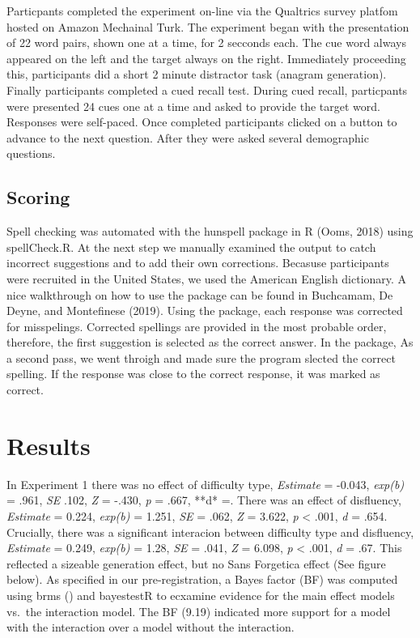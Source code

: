\documentclass[pdf]{apa6}
\begin{document}
Particpants completed the experiment on-line via the Qualtrics survey platfom hosted on Amazon Mechainal Turk. The experiment began with the presentation of 22 word pairs, shown one at a time, for 2 secconds each. The cue word always appeared on the left and the target always on the right. Immediately proceeding this, participants did a short 2 minute distractor task (anagram generation). Finally participants completed a cued recall test. During cued recall, particpants were presented 24 cues one at a time and asked to provide the target word. Responses were self-paced. Once completed participants clicked on a button to advance to the next question. After they were asked several demographic questions.

\hypertarget{scoring}{%
\subsection{Scoring}\label{scoring}}

Spell checking was automated with the hunspell package in R (Ooms, 2018) using spellCheck.R. At the next step we manually examined the output to catch incorrect suggestions and to add their own corrections. Becasuse participants were recruited in the United States, we used the American English dictionary. A nice walkthrough on how to use the package can be found in Buchcamam, De Deyne, and Montefinese (2019). Using the package, each response was corrected for misspelings. Corrected spellings are provided in the most probable order, therefore, the first suggestion is selected as the correct answer. In the package, As a second pass, we went throigh and made sure the program slected the correct
spelling. If the response was close to the correct response, it was marked as correct.

\hypertarget{results}{%
\section{Results}\label{results}}

In Experiment 1 there was no effect of difficulty type, \emph{Estimate} = -0.043, \emph{exp(b)} = .961, \emph{SE} .102, \emph{Z} = -.430, \emph{p} = .667, **d* =. There was an effect of disfluency, \emph{Estimate} = 0.224, \emph{exp(b)} = 1.251, \emph{SE} = .062, \emph{Z} = 3.622, \emph{p} \textless{} .001, \emph{d} = .654. Crucially, there was a significant interacion between difficulty type and disfluency, \emph{Estimate} = 0.249, \emph{exp(b)} = 1.28, \emph{SE} = .041, \emph{Z} = 6.098, \emph{p} \textless{} .001, \emph{d} = .67. This reflected a sizeable generation effect, but no Sans Forgetica effect (See figure below). As specified in our pre-registration, a Bayes factor (BF) was computed using brms () and bayestestR to ecxamine evidence for the main effect models vs.~the interaction model. The BF (9.19) indicated more support for a model with the interaction over a model without the interaction.
\end{document}
